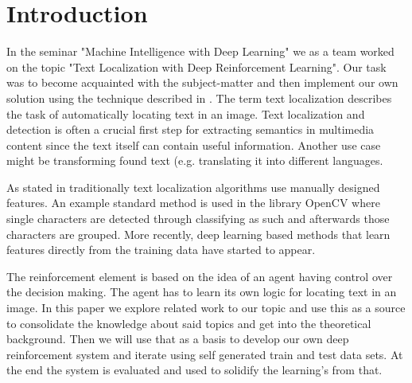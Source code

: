 \section{Introduction}

In the seminar "Machine Intelligence with Deep Learning" we as a team worked on the topic "Text Localization with Deep Reinforcement Learning". Our task was to become acquainted with the subject-matter and then implement our own solution using the technique described in \cite{caicedo2015active}. 
The term text localization describes the task of automatically locating text in an image.
Text localization and detection is often a crucial first step for extracting semantics in multimedia content since the text itself can contain useful information. Another use case might be transforming found text (e.g. translating it into different languages.

As stated in \cite{DBLP:journals/corr/ZhouYWWZHL17} traditionally text localization algorithms use manually designed features.
An example standard method is used in the library OpenCV \cite{OpenCVSceneTextDetection} where single characters are detected through classifying as such and afterwards those characters are grouped.
More recently, deep learning based methods that learn features directly from the training data have started to appear. 

The reinforcement element is based on the idea of an agent having control over the decision making. The agent has to learn its own logic for locating text in an image.
In this paper we explore related work to our topic and use this as a source to consolidate the knowledge about said topics and get into the theoretical background.
Then we will use that as a basis to develop our own deep reinforcement system and iterate using self generated train and test data sets. At the end the system is evaluated and used to solidify the learning's from that.
